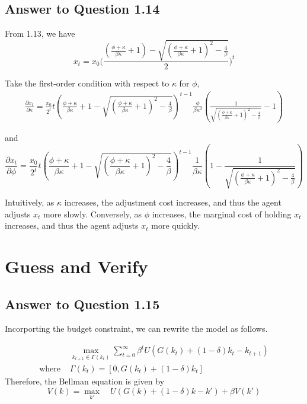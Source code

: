 \documentclass[11pt]{article}
\theoremstyle{definition}
\theoremstyle{boldtitle} %
\numberwithin{equation}{section}
\numberwithin{figure}{section}
\numberwithin{table}{section}
\begin{document}
\subsection*{Answer to Question 1.14}
From 1.13, we have
\[
x_t = x_0 \bigg(\frac{\left( \frac{\phi + \kappa }{\beta \kappa } + 1 \right) -  \sqrt{\left(\frac{\phi + \kappa }{\beta \kappa } + 1 \right)^2 -\frac{4}{\beta}} }{2} \bigg)^t 
\]

Take the first-order condition with respect to $\kappa$ for $\phi$, 
\begin{align*}
\frac{\partial x_t}{\partial \kappa} = \frac{x_0}{2^t} t \left(\frac{\phi + \kappa }{\beta \kappa } + 1 -  \sqrt{\left(\frac{\phi + \kappa }{\beta \kappa } + 1 \right)^2 -\frac{4}{\beta}} \right)^{t-1} \frac{\phi}{\beta \kappa^2} \left(\frac{1}{\sqrt{\left(\frac{\phi + \kappa }{\beta \kappa } + 1 \right)^2 -\frac{4}{\beta}}} - 1\right)
\end{align*}

and
\[
\frac{\partial x_t}{\partial \phi} = \frac{x_0}{2^t} t \left(\frac{\phi + \kappa }{\beta \kappa } + 1 -  \sqrt{\left(\frac{\phi + \kappa }{\beta \kappa } + 1 \right)^2 -\frac{4}{\beta}} \right)^{t-1} \frac{1}{\beta \kappa} \left(1 - \frac{1}{\sqrt{\left(\frac{\phi + \kappa }{\beta \kappa } + 1 \right)^2 -\frac{4}{\beta}}} \right)
\]

Intuitively, as $\kappa$ increases, the adjustment cost increases, and thus the agent adjusts $x_t$ more slowly.
Conversely, as $\phi$ increases, the marginal cost of holding $x_t$ increases, and thus the agent adjusts $x_t$ more quickly.


\section*{Guess and Verify}
\subsection*{Answer to Question 1.15}
Incorporting the budget constraint, we can rewrite the model as follows.

\begin{align*}
& \max_{k_{t+1} \in \Gamma(k_t) } \sum_{t=0}^\infty \beta^t U(G(k_t) + (1 - \delta) k_t - k_{t+1}) \\ 
\text {where } & \Gamma(k_t) = [0, G(k_t) + (1 - \delta) k_t]
\end{align*}
Therefore, the Bellman equation is given by 
\[
V(k) = \max_{k'} \quad  U(G(k) + (1 - \delta) k - k') + \beta V(k')
\]
\end{document}
